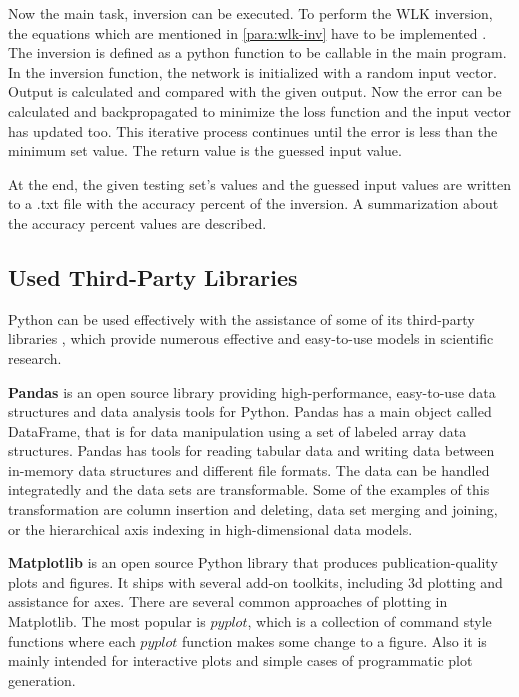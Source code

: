 Now the main task, inversion can be executed. To perform the WLK inversion, the equations which are mentioned in \autoref{para:wlk-inv} have to be implemented \cite{nazari1992implementation}. The inversion is defined as a python function to be callable in the main program. In the inversion function, the network is initialized with a random input vector. Output is calculated and compared with the given output. Now the error can be calculated and backpropagated to minimize the loss function and the input vector has updated too. This iterative process continues until the error is less than the minimum set value. The return value is the guessed input value. \smallskip

At the end, the given testing set's values and the guessed input values are written to a .txt file with the accuracy percent of the inversion. A summarization about the accuracy percent values are described.



\subsection{Used Third-Party Libraries}

Python can be used effectively with the assistance of some of its third-party libraries \cite{bressert2012scipy}\cite{chen2017pandas}, which provide numerous effective and easy-to-use models in scientific research. \bigskip

\textbf{Pandas} is an open source library providing high-performance, easy-to-use data structures and data analysis tools for Python. Pandas has a main object called DataFrame, that is for data manipulation using a set of labeled array data structures. Pandas has tools for reading tabular data and writing data between in-memory data structures and different file formats. The data can be handled integratedly and the data sets are transformable. Some of the examples of this transformation are column insertion and deleting, data set merging and joining, or the hierarchical axis indexing in high-dimensional data models.\bigskip


\textbf{Matplotlib} is an open source Python library that produces publication-quality plots and figures. It ships with several add-on toolkits, including 3d plotting and assistance for axes. There are several common approaches of plotting in Matplotlib. The most popular is $pyplot$, which is a collection of command style functions where each $pyplot$ function makes some change to a figure. Also it is mainly intended for interactive plots and simple cases of programmatic plot generation.\bigskip

